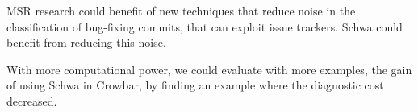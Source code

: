 MSR research could benefit of new techniques that reduce noise in the
classification of bug-fixing commits, that can exploit issue trackers. Schwa
could benefit from reducing this noise.

With more computational power, we could evaluate with more examples, the gain of
using Schwa in Crowbar, by finding an example where the diagnostic cost decreased.
